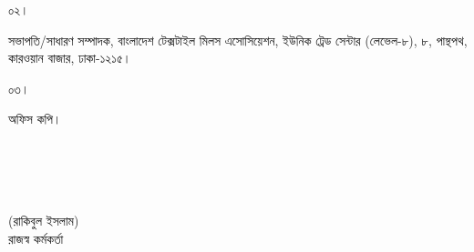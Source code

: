 \documentclass[12pt]{article}
\begin{document}
\begin{minipage}[t]{0.06\linewidth}
\footnotesize{০২।}
\end{minipage}
\begin{minipage}[t]{0.94\linewidth}
সভাপতি/সাধারণ সম্পাদক, বাংলাদেশ টেক্সটাইল
মিলস এসোসিয়েশন, ইউনিক ট্রেড সেন্টার (লেভেল-৮),
৮, পান্থপথ, কারওয়ান বাজার, ঢাকা-১২১৫।
\end{minipage}
\begin{minipage}[t]{0.06\linewidth}
\footnotesize{০৩।}
\end{minipage}
\begin{minipage}[t]{0.94\linewidth}
 অফিস কপি।
 \\
 \\
 \\
 \\
 \\
\end{minipage}
\begin{minipage}[t]{0.60\linewidth}
\hspace{1em}
\end{minipage}
\normalsize
\begin{minipage}[t]{0.40\linewidth}
\begin{center}
(রাকিবুল ইসলাম)
\\
রাজস্ব কর্মকর্তা
\end{center}
\end{minipage}
\thispagestyle{slogan}
\end{document}
